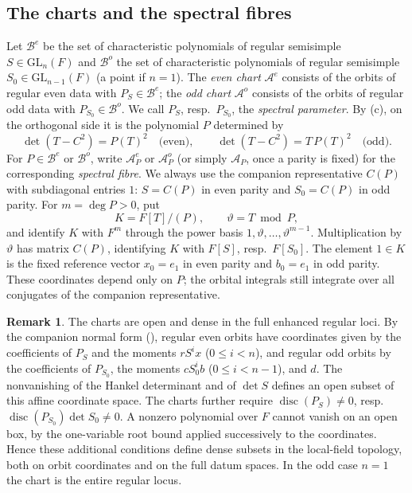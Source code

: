 \documentclass[11pt,oneside,notitlepage]{book}
\numberwithin{equation}{section}
\theoremstyle{plain}
\theoremstyle{definition}
\newtheorem{remark}[theorem]{Remark}
\newcommand{\GL}{\mathrm{GL}}
\newcommand{\cB}{\mathcal{B}}
\begin{document}
\subsection*{The charts and the spectral fibres}
Let $\cB^e$ be the set of characteristic polynomials of regular semisimple $S\in\GL_n(F)$ and $\cB^o$ the set of characteristic polynomials of regular semisimple $S_0\in\GL_{n-1}(F)$ (a point if $n=1$). The \emph{even chart} $\mathcal A^e$ consists of the orbits of regular even data with $P_S\in\cB^e$; the \emph{odd chart} $\mathcal A^o$ consists of the orbits of regular odd data with $P_{S_0}\in\cB^o$. We call $P_S$, resp.\ $P_{S_0}$, the \emph{spectral parameter}. By (c), on the orthogonal side it is the polynomial $P$ determined by
\[
 \det(T-C^2)=P(T)^2\quad\text{(even)},\qquad
 \det(T-C^2)=T\,P(T)^2\quad\text{(odd)}.
\]
For $P\in\cB^e$ or $\cB^o$, write $\mathcal A_P^e$ or $\mathcal A_P^o$ (or simply $\mathcal A_P$, once a parity is fixed) for the corresponding \emph{spectral fibre}. We always use the companion representative $C(P)$ with subdiagonal entries $1$: $S=C(P)$ in even parity and $S_0=C(P)$ in odd parity. For $m=\deg P>0$, put
\[
 K=F[T]/(P),\qquad \vartheta=T\bmod P,
\]
and identify $K$ with $F^m$ through the power basis $1,\vartheta,\ldots,\vartheta^{m-1}$. Multiplication by $\vartheta$ has matrix $C(P)$, identifying $K$ with $F[S]$, resp.\ $F[S_0]$. The element $1\in K$ is the fixed reference vector $x_0=e_1$ in even parity and $b_0=e_1$ in odd parity. These coordinates depend only on $P$; the orbital integrals still integrate over all conjugates of the companion representative.

\begin{remark}\label{rem:chart-density}
The charts are open and dense in the full enhanced regular loci. By the companion normal form (), regular even orbits have coordinates given by the coefficients of $P_S$ and the moments $rS^ix$ ($0\le i<n$), and regular odd orbits by the coefficients of $P_{S_0}$, the moments $cS_0^ib$ ($0\le i<n-1$), and $d$. The nonvanishing of the Hankel determinant and of $\det S$ defines an open subset of this affine coordinate space. The charts further require $\operatorname{disc}(P_S)\ne0$, resp.\ $\operatorname{disc}(P_{S_0})\det S_0\ne0$. A nonzero polynomial over $F$ cannot vanish on an open box, by the one-variable root bound applied successively to the coordinates. Hence these additional conditions define dense subsets in the local-field topology, both on orbit coordinates and on the full datum spaces. In the odd case $n=1$ the chart is the entire regular locus. 
\end{remark}
\end{document}
